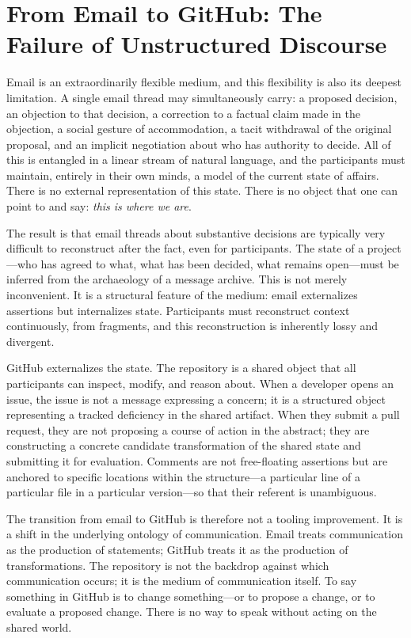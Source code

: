 \documentclass[12pt, letterpaper]{article}
\begin{document}
\section{From Email to GitHub: The Failure of Unstructured Discourse}

Email is an extraordinarily flexible medium, and this flexibility is also its deepest limitation. A single email thread may simultaneously carry: a proposed decision, an objection to that decision, a correction to a factual claim made in the objection, a social gesture of accommodation, a tacit withdrawal of the original proposal, and an implicit negotiation about who has authority to decide. All of this is entangled in a linear stream of natural language, and the participants must maintain, entirely in their own minds, a model of the current state of affairs. There is no external representation of this state. There is no object that one can point to and say: \textit{this is where we are}.

The result is that email threads about substantive decisions are typically very difficult to reconstruct after the fact, even for participants. The state of a project---who has agreed to what, what has been decided, what remains open---must be inferred from the archaeology of a message archive. This is not merely inconvenient. It is a structural feature of the medium: email externalizes assertions but internalizes state. Participants must reconstruct context continuously, from fragments, and this reconstruction is inherently lossy and divergent.

GitHub externalizes the state. The repository is a shared object that all participants can inspect, modify, and reason about. When a developer opens an issue, the issue is not a message expressing a concern; it is a structured object representing a tracked deficiency in the shared artifact. When they submit a pull request, they are not proposing a course of action in the abstract; they are constructing a concrete candidate transformation of the shared state and submitting it for evaluation. Comments are not free-floating assertions but are anchored to specific locations within the structure---a particular line of a particular file in a particular version---so that their referent is unambiguous.

The transition from email to GitHub is therefore not a tooling improvement. It is a shift in the underlying ontology of communication. Email treats communication as the production of statements; GitHub treats it as the production of transformations. The repository is not the backdrop against which communication occurs; it is the medium of communication itself. To say something in GitHub is to change something---or to propose a change, or to evaluate a proposed change. There is no way to speak without acting on the shared world.
\end{document}
